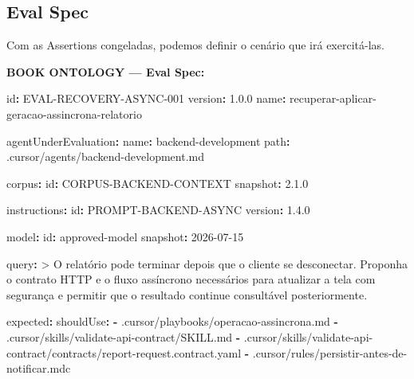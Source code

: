 \documentclass[
  10pt,
  a4paper,
  oneside]{book}
\newenvironment{Shaded}{}{}
\newcommand{\AttributeTok}[1]{\textcolor[rgb]{0.49,0.56,0.16}{#1}}
\newcommand{\CharTok}[1]{\textcolor[rgb]{0.25,0.44,0.63}{#1}}
\newcommand{\FloatTok}[1]{\textcolor[rgb]{0.25,0.63,0.44}{#1}}
\newcommand{\FunctionTok}[1]{\textcolor[rgb]{0.02,0.16,0.49}{#1}}
\newcommand{\KeywordTok}[1]{\textcolor[rgb]{0.00,0.44,0.13}{\textbf{#1}}}
\newcommand{\NormalTok}[1]{#1}
\renewenvironment{Shaded}{\begin{snugshade}}{\end{snugshade}}%
\begin{document}
\hypertarget{eval-spec}{%
\subsection{Eval Spec}\label{eval-spec}}

Com as Assertions congeladas, podemos definir o cenário que irá
exercitá-las.

\textbf{BOOK ONTOLOGY --- Eval Spec:}

\begin{Shaded}
\begin{Highlighting}[]
\FunctionTok{id}\KeywordTok{:}\AttributeTok{ EVAL{-}RECOVERY{-}ASYNC{-}001}
\FunctionTok{version}\KeywordTok{:}\AttributeTok{ }\FloatTok{1.0.0}
\FunctionTok{name}\KeywordTok{:}\AttributeTok{ recuperar{-}aplicar{-}geracao{-}assincrona{-}relatorio}

\FunctionTok{agentUnderEvaluation}\KeywordTok{:}
\AttributeTok{  }\FunctionTok{name}\KeywordTok{:}\AttributeTok{ backend{-}development}
\AttributeTok{  }\FunctionTok{path}\KeywordTok{:}\AttributeTok{ .cursor/agents/backend{-}development.md}

\FunctionTok{corpus}\KeywordTok{:}
\AttributeTok{  }\FunctionTok{id}\KeywordTok{:}\AttributeTok{ CORPUS{-}BACKEND{-}CONTEXT}
\AttributeTok{  }\FunctionTok{snapshot}\KeywordTok{:}\AttributeTok{ }\FloatTok{2.1.0}

\FunctionTok{instructions}\KeywordTok{:}
\AttributeTok{  }\FunctionTok{id}\KeywordTok{:}\AttributeTok{ PROMPT{-}BACKEND{-}ASYNC}
\AttributeTok{  }\FunctionTok{version}\KeywordTok{:}\AttributeTok{ }\FloatTok{1.4.0}

\FunctionTok{model}\KeywordTok{:}
\AttributeTok{  }\FunctionTok{id}\KeywordTok{:}\AttributeTok{ approved{-}model}
\AttributeTok{  }\FunctionTok{snapshot}\KeywordTok{:}\AttributeTok{ 2026{-}07{-}15}

\FunctionTok{query}\KeywordTok{: }\CharTok{\textgreater{}}
\NormalTok{  O relatório pode terminar depois que o cliente se desconectar.}
\NormalTok{  Proponha o contrato HTTP e o fluxo assíncrono necessários para}
\NormalTok{  atualizar a tela com segurança e permitir que o resultado}
\NormalTok{  continue consultável posteriormente.}

\FunctionTok{expected}\KeywordTok{:}
\AttributeTok{  }\FunctionTok{shouldUse}\KeywordTok{:}
\AttributeTok{    }\KeywordTok{{-}}\AttributeTok{ .cursor/playbooks/operacao{-}assincrona.md}
\AttributeTok{    }\KeywordTok{{-}}\AttributeTok{ .cursor/skills/validate{-}api{-}contract/SKILL.md}
\AttributeTok{    }\KeywordTok{{-}}\AttributeTok{ .cursor/skills/validate{-}api{-}contract/contracts/report{-}request.contract.yaml}
\AttributeTok{    }\KeywordTok{{-}}\AttributeTok{ .cursor/rules/persistir{-}antes{-}de{-}notificar.mdc}


\end{Highlighting}
\end{Shaded}
\end{document}
